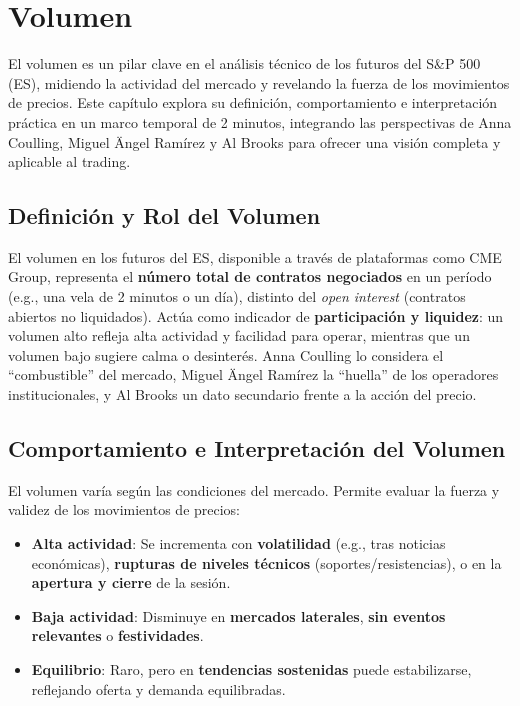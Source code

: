 \chapter{Volumen}  %

El volumen es un pilar clave en el an\'alisis t\'ecnico de los futuros del S\&P 500 (ES), midiendo la actividad del mercado y revelando la fuerza de los movimientos de precios. Este cap\'itulo explora su definici\'on, comportamiento e interpretaci\'on pr\'actica en un marco temporal de 2 minutos, integrando las perspectivas de Anna Coulling, Miguel \"Angel Ram\'irez y Al Brooks para ofrecer una visi\'on completa y aplicable al trading.

\section{Definici\'on y Rol del Volumen}

El volumen en los futuros del ES, disponible a trav\'es de plataformas como CME Group, representa el \textbf{n\'umero total de contratos negociados} en un per\'iodo (e.g., una vela de 2 minutos o un d\'ia), distinto del \textit{open interest} (contratos abiertos no liquidados). Act\'ua como indicador de \textbf{participaci\'on y liquidez}: un volumen alto refleja alta actividad y facilidad para operar, mientras que un volumen bajo sugiere calma o desinter\'es. Anna Coulling lo considera el ``combustible'' del mercado, Miguel \"Angel Ram\'irez la ``huella'' de los operadores institucionales, y Al Brooks un dato secundario frente a la acci\'on del precio.

\section{Comportamiento e Interpretaci\'on del Volumen}

El volumen var\'ia seg\'un las condiciones del mercado. Permite evaluar la fuerza y validez de los movimientos de precios:

\begin{itemize}
    \item \textbf{Alta actividad}: Se incrementa con \textbf{volatilidad} (e.g., tras noticias econ\'omicas), \textbf{rupturas de niveles t\'ecnicos} (soportes/resistencias), o en la \textbf{apertura y cierre} de la sesi\'on.
    \item \textbf{Baja actividad}: Disminuye en \textbf{mercados laterales}, \textbf{sin eventos relevantes} o \textbf{festividades}.
    \item \textbf{Equilibrio}: Raro, pero en \textbf{tendencias sostenidas} puede estabilizarse, reflejando oferta y demanda equilibradas.
\end{itemize}

